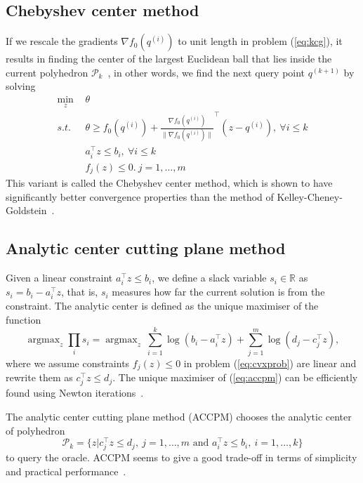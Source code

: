 \documentclass[9pt]{extarticle}
\DeclareMathOperator*{\argmax}{argmax}
\begin{document}
\subsection{Chebyshev center method}
\label{sec:chebyshev}

If we rescale the gradients $\nabla f_0(q^{(i)})$ to unit length in problem (\ref{eq:kcg}), 
it results in finding the center of the largest Euclidean ball that lies inside the current polyhedron $\mathcal{P}_k$~\cite{wulff2013analytic},
in other words, we find the next query point $q^{(k+1)}$ by solving
\begin{equation}
\label{eq:chebyshev}
\begin{aligned}
\min_{z} ~& \theta  \\
s.t.~~   ~& \theta \ge f_0(q^{(i)}) + \frac{\nabla f_0(q^{(i)})}{\|\nabla f_0(q^{(i)})\|} ^\top (z - q^{(i)}),~ \forall i \le k \\
          & a_i^\top z \le b_i,~ \forall i \le k \\
          & f_j(z) \le 0.~ j = 1, \dots, m
\end{aligned}
\end{equation}
This variant is called the Chebyshev center method, which is shown to have significantly better convergence properties than the method of Kelley-Cheney-Goldstein~\cite{goffin2002convex}.


\subsection{Analytic center cutting plane method}
\label{sec:accpm}

Given a linear constraint $a_i^\top z \le b_i$, we define a slack variable $s_i \in \mathbb{R}$ as $s_i = b_i - a_i^\top z$,
that is, $s_i$ measures how far the current solution is from the constraint.
The analytic center is defined as the unique maximiser of the function~\cite{wulff2013analytic}
\begin{equation}
\label{eq:accpm}
\argmax_z \prod_i s_i = \argmax_z ~ \sum_{i=1}^k \log(b_i - a_i^\top z) + \sum_{j=1}^m \log(d_j - c_j^\top z),
\end{equation}
where we assume constraints $f_j(z) \le 0$ in problem (\ref{eq:cvxprob}) are linear and rewrite them as $c_j^\top z \le d_j$.
The unique maximiser of (\ref{eq:accpm}) can be efficiently found using Newton iterations~\cite{goffin2002convex}.

The analytic center cutting plane method (ACCPM) chooses the analytic center of polyhedron 
\begin{equation*}
\mathcal{P}_k = \{ z | c_j^\top z \le d_j, ~ j=1, \dots, m \text{~and~} a_i^\top z \le b_i, ~ i=1, \dots, k \}
\end{equation*}
to query the oracle.
ACCPM seems to give a good trade-off in terms of simplicity and practical performance~\cite{boydlocalization}.
\end{document}
